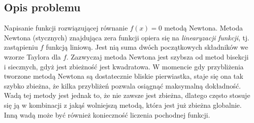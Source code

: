 \documentclass[11pt]{mk-polish-lab-report}
\begin{document}
\subsection{Opis problemu}
Napisanie funkcji rozwiązującej równanie $f(x) = 0$ metodą Newtona. Metoda Newtona (stycznych) znajdująca zera funkcji opiera się na \emph{linearyzacji funkcji}, tj. zastąpieniu $f$ funkcją liniową. Jest nią suma dwóch początkowych składników we wzorze Taylora dla $f$. Zazwyczaj metoda Newtona jest szybsza od metod bisekcji i siecznych, gdyż jest zbieżność jest kwadratowa. W momencie gdy przybliżenia tworzone metodą Newtona są dostatecznie bliskie pierwiastka, staje się ona tak szybko zbieżna, że kilka przybliżeń pozwala osiągnąć maksymalną dokładność. Wadą tej metody jest jednak to, że nie zawsze jest zbieżna, dlatego często stosuje się ją w kombinacji z jakąś wolniejszą metodą, która jest już zbieżna globalnie. Inną wadą może być również konieczność liczenia pochodnej funkcji.
\end{document}

